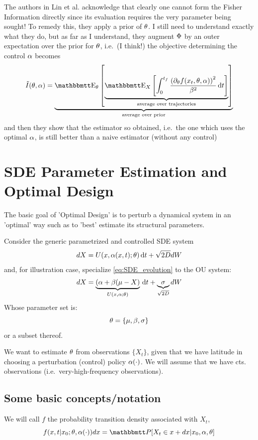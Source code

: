 The authors in Lin et al. \cite{Lin} acknowledge that clearly one cannot form
the Fisher Information directly since its evaluation requires the very parameter
being sought! To remedy this, they apply a prior of ${ \theta}$. I still need to
understand exactly what they do, but as far as I understand, they augment ${\Phi}$
by an outer expectation over the prior for ${ \theta}$, i.e.\ (I think!) the objective
determining the control $\alpha$ becomes
\begin{equation}
\tilde{I}(\th, \a) = \underbrace{\Exp_\th \left [
\underbrace{\Exp_{X} \left[ \int_0^\tf
\frac{ \left( \di_\th f(x_t,\th, \a) \right)^2}{\b^2}
\intd{t}
\right]}_{\textrm{average over trajectories}}
\right]}_{\textrm{average over prior}}
\label{eq:Fisher_Information}
\end{equation}
and then they show that the estimator so obtained, i.e.\ the one which uses the
optimal $\alpha$, is still better than a naive estimator (without any control)
   


\section{SDE Parameter Estimation and Optimal Design}
The basic goal of 'Optimal Design' is to perturb a dynamical system in an
'optimal' way such as to 'best' estimate its structural parameters.

Consider the generic parametrized and controlled SDE system 
\begin{equation}
dX = U(x,\alpha(x,t); { \theta}) \, \mathrm{d} t + \sqrt{2D} dW
\label{eq:SDE_evolution} 
\end{equation}
and, for illustration case, specialize \cref{eq:SDE_evolution} to the OU
system:
\begin{equation}
dX = \underbrace{(\alpha + \beta( \mu - X)}_{U(x,\alpha; { \theta})} \, \mathrm{d} t +
\underbrace{\sigma}_{\sqrt{2D}} dW
\label{eq:OU_evolution} 
\end{equation}
Whose parameter set is:
$$
{ \theta} = \{{\mu }, \beta, \sigma\}
$$
or a subset thereof.

We want to estimate ${ \theta}$  from observations $\{ X_t \}$, given that we have
latitude in choosing a perturbation (control) policy $\alpha(\cdot)$. We will assume
that we have cts. observations (i.e.\ very-high-frequency observations). 

\subsection{Some basic concepts/notation}
We will call $f$ the probability transition density associated with $X_t$, 
\begin{equation}
f(x,t| x_0 ;\th, \a(\cdot)) dx = \Prob[ X_t \in x + dx | x_0, \a, \th]
\end{equation} 

